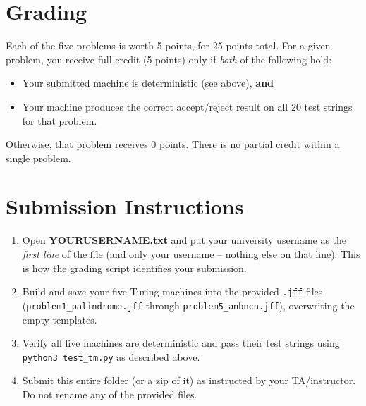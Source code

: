 \documentclass[11pt]{article}
\begin{document}
\section*{Grading}

Each of the five problems is worth 5 points, for 25 points total. For a
given problem, you receive full credit (5 points) only if \emph{both} of
the following hold:

\begin{itemize}
  \item Your submitted machine is deterministic (see above), \textbf{and}
  \item Your machine produces the correct accept/reject result on all 20
        test strings for that problem.
\end{itemize}

Otherwise, that problem receives 0 points. There is no partial credit
within a single problem.

\section*{Submission Instructions}

\begin{enumerate}
  \item Open \textbf{YOURUSERNAME.txt} and put your university username
        as the \emph{first line} of the file (and only your username --
        nothing else on that line). This is how the grading script
        identifies your submission.
  \item Build and save your five Turing machines into the provided
        \texttt{.jff} files (\texttt{problem1\_palindrome.jff} through
        \texttt{problem5\_anbncn.jff}), overwriting the empty templates.
  \item Verify all five machines are deterministic and pass their test
        strings using \texttt{python3 test\_tm.py} as described above.
  \item Submit this entire folder (or a zip of it) as instructed by your
        TA/instructor. Do not rename any of the provided files.
\end{enumerate}
\end{document}
